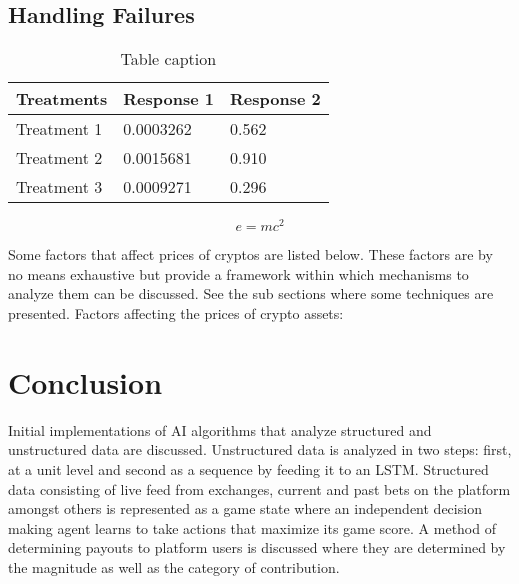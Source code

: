 \documentclass[preprint,12pt]{elsarticle}
\begin{document}
\subsection{Handling Failures}

\begin{table}[h]
\centering
\begin{tabular}{l l l}
\hline
\textbf{Treatments} & \textbf{Response 1} & \textbf{Response 2}\\
\hline
Treatment 1 & 0.0003262 & 0.562 \\
Treatment 2 & 0.0015681 & 0.910 \\
Treatment 3 & 0.0009271 & 0.296 \\
\hline
\end{tabular}
\caption{Table caption}
\end{table}


\begin{equation}
\label{eq:emc}
e = mc^2
\end{equation}

Some factors that affect prices of cryptos are listed below. These factors are by no means exhaustive but provide a
framework within which mechanisms to analyze them can be discussed. See the sub sections where some techniques are
presented. \cite{Picolo_Whitepaper}
Factors affecting the prices of crypto assets:

\section{Conclusion}
Initial implementations of AI algorithms that analyze structured and unstructured data are discussed. Unstructured data is analyzed in two steps: first, at a unit level and second as a sequence by feeding it to an LSTM. Structured data consisting of live feed from exchanges, current and past bets on the platform amongst others is represented as a game state where an independent decision making agent learns to take actions that maximize its game score. A method of determining payouts to platform users is discussed where they are determined by the magnitude as well as the category of contribution.



\end{document}

